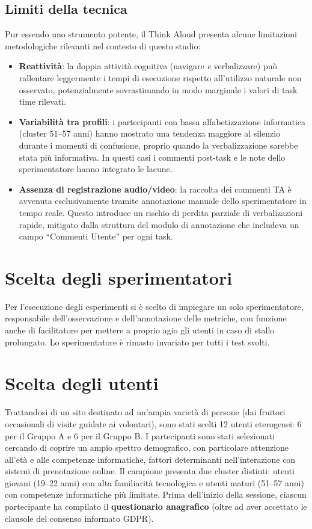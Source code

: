 \subsection{Limiti della tecnica}
Pur essendo uno strumento potente, il Think Aloud presenta alcune limitazioni metodologiche rilevanti nel contesto di questo studio:
\begin{itemize}
    \item \textbf{Reattività}: la doppia attività cognitiva (navigare \emph{e} verbalizzare) può rallentare leggermente i tempi di esecuzione rispetto all'utilizzo naturale non osservato, potenzialmente sovrastimando in modo marginale i valori di task time rilevati.
    \item \textbf{Variabilità tra profili}: i partecipanti con bassa alfabetizzazione informatica (cluster 51--57 anni) hanno mostrato una tendenza maggiore al silenzio durante i momenti di confusione, proprio quando la verbalizzazione sarebbe stata più informativa. In questi casi i commenti post-task e le note dello sperimentatore hanno integrato le lacune.
    \item \textbf{Assenza di registrazione audio/video}: la raccolta dei commenti TA è avvenuta esclusivamente tramite annotazione manuale dello sperimentatore in tempo reale. Questo introduce un rischio di perdita parziale di verbalizazioni rapide, mitigato dalla struttura del modulo di annotazione che includeva un campo ``Commenti Utente'' per ogni task.
\end{itemize}

\section{Scelta degli sperimentatori}

Per l'esecuzione degli esperimenti si è scelto di impiegare un solo sperimentatore, responsabile dell'osservazione e dell'annotazione delle metriche, con funzione anche di facilitatore per mettere a proprio agio gli utenti in caso di stallo prolungato. Lo sperimentatore è rimasto invariato per tutti i test svolti.

\section{Scelta degli utenti}

Trattandosi di un sito destinato ad un'ampia varietà di persone (dai fruitori occasionali di visite guidate ai volontari), sono stati scelti 12 utenti eterogenei: 6 per il Gruppo A e 6 per il Gruppo B.
I partecipanti sono stati selezionati cercando di coprire un ampio spettro demografico, con particolare attenzione all'età e alle competenze informatiche, fattori determinanti nell'interazione con sistemi di prenotazione online. Il campione presenta due cluster distinti: utenti giovani (19--22 anni) con alta familiarità tecnologica e utenti maturi (51--57 anni) con competenze informatiche più limitate.
Prima dell'inizio della sessione, ciascun partecipante ha compilato il \textbf{questionario anagrafico} (oltre ad aver accettato le clausole del consenso informato GDPR).

